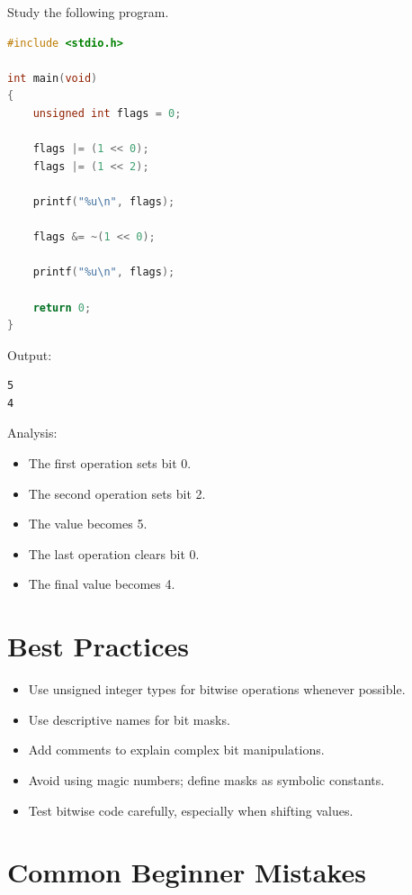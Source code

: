 \documentclass[12pt,openany]{book}
\begin{document}
Study the following program.

\begin{lstlisting}[language=C]
#include <stdio.h>

int main(void)
{
    unsigned int flags = 0;

    flags |= (1 << 0);
    flags |= (1 << 2);

    printf("%u\n", flags);

    flags &= ~(1 << 0);

    printf("%u\n", flags);

    return 0;
}
\end{lstlisting}

Output:

\begin{lstlisting}
5
4
\end{lstlisting}

Analysis:

\begin{itemize}
    \item The first operation sets bit 0.
    \item The second operation sets bit 2.
    \item The value becomes 5.
    \item The last operation clears bit 0.
    \item The final value becomes 4.
\end{itemize}

\section{Best Practices}

\begin{itemize}
    \item Use unsigned integer types for bitwise operations whenever possible.
    \item Use descriptive names for bit masks.
    \item Add comments to explain complex bit manipulations.
    \item Avoid using magic numbers; define masks as symbolic constants.
    \item Test bitwise code carefully, especially when shifting values.
\end{itemize}
\section{Common Beginner Mistakes}
\end{document}
